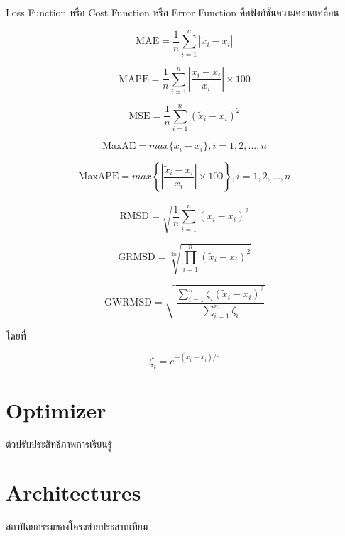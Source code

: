 Loss Function หรือ Cost Function หรือ Error Function คือฟังก์ชันความคลาดเคลื่อน

\begin{equation}
    \text{MAE} = \frac{1}{n} \sum_{i=1}^{n} | \tilde{x}_{i} - x_{i} |
\end{equation}

\begin{equation}
    \text{MAPE} = \frac{1}{n} \sum_{i=1}^{n} \left| \frac{\tilde{x}_{i} - x_{i}}{x_{i}} \right| \times 100
\end{equation}

\begin{equation}
    \text{MSE} = \frac{1}{n} \sum_{i=1}^{n} \left( \tilde{x}_{i} - x_{i} \right)^2
\end{equation}

\begin{equation}
    \text{MaxAE} = max\{\tilde{x}_{i} - x_{i}\}, i = 1, 2, ..., n
\end{equation}

\begin{equation}
    \text{MaxAPE} = max\left\{\left| \frac{\tilde{x}_{i} - x_{i}}{x_{i}} \right| \times 100 \right\}, i = 1, 2, ..., n
\end{equation}

\begin{equation}
    \text{RMSD} = \sqrt{ \frac{1}{n} \sum_{i=1}^{n} (\tilde{x}_{i} - x_{i})^{2} }
    \label{eq:rmsd}
\end{equation}

\begin{equation}
    \text{GRMSD} = \sqrt[2n]{ \prod_{i=1}^{n} (\tilde{x}_{i} - x_{i})^{2} }
    \label{eq:grmsd}
\end{equation}

\begin{equation}
    \text{GWRMSD} = \sqrt{ \frac{\sum_{i=1}^{n} \zeta_{i} (\tilde{x}_{i} - x_{i})^{2}}{\sum_{i=1}^{n} \zeta_{i} } }
    \label{eq:gwrmsd}
\end{equation}

\indent โดยที่

\begin{equation}
    \zeta_{i} = e^{-(\tilde{x}_{i} - x_{i}) / c}
\end{equation}

\section{Optimizer}
\label{sec:optimizer}

ตัวปรับประสิทธิภาพการเรียนรู้

\section{Architectures}
\label{sec:architecture}

สถาปัตยกรรมของโครงข่ายประสาทเทียม

